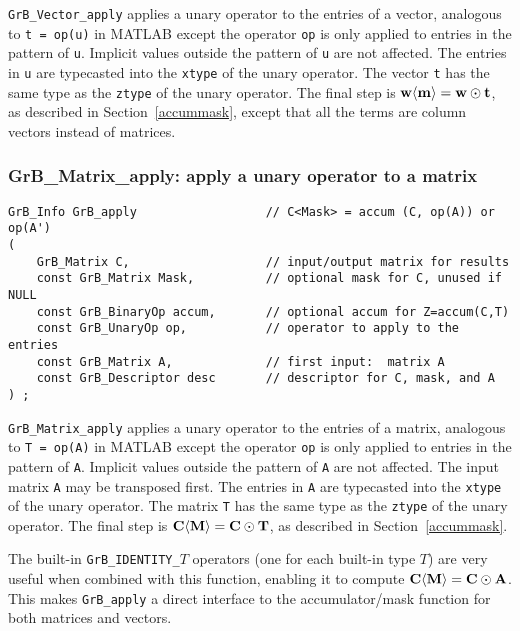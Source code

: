 \documentclass[12pt]{article}
\begin{document}
\verb'GrB_Vector_apply' applies a unary operator to the entries of a vector,
analogous to \verb't = op(u)'  in MATLAB except the operator \verb'op' is only
applied to entries in the pattern of \verb'u'.  Implicit values outside the
pattern of \verb'u' are not affected.  The entries in \verb'u' are typecasted
into the \verb'xtype' of the unary operator.  The vector \verb't' has the same
type as the \verb'ztype' of the unary operator.  The final step is ${\bf w
\langle m \rangle  = w \odot t}$, as described in Section~\ref{accummask},
except that all the terms are column vectors instead of matrices.

\newpage
\subsubsection{{\sf GrB\_Matrix\_apply:} apply a unary operator to a matrix}
\label{apply_matrix}

\begin{mdframed}[userdefinedwidth=6in]
{\footnotesize
\begin{verbatim}
GrB_Info GrB_apply                  // C<Mask> = accum (C, op(A)) or op(A')
(
    GrB_Matrix C,                   // input/output matrix for results
    const GrB_Matrix Mask,          // optional mask for C, unused if NULL
    const GrB_BinaryOp accum,       // optional accum for Z=accum(C,T)
    const GrB_UnaryOp op,           // operator to apply to the entries
    const GrB_Matrix A,             // first input:  matrix A
    const GrB_Descriptor desc       // descriptor for C, mask, and A
) ;
\end{verbatim} } \end{mdframed}

\verb'GrB_Matrix_apply'
applies a unary operator to the entries of a matrix, analogous to
\verb'T = op(A)'  in MATLAB except the operator \verb'op' is only applied to
entries in the pattern of \verb'A'.  Implicit values outside the pattern of
\verb'A' are not affected.  The input matrix \verb'A' may be transposed first.
The entries in \verb'A' are typecasted into the \verb'xtype' of the unary
operator.  The matrix \verb'T' has the same type as the \verb'ztype' of the
unary operator.  The final step is ${\bf C \langle M \rangle  = C \odot T}$, as
described in Section~\ref{accummask}.

The built-in \verb'GrB_IDENTITY_'$T$ operators (one for each built-in type $T$)
are very useful when combined with this function, enabling it to compute ${\bf
C \langle M \rangle  = C \odot A}$.  This makes \verb'GrB_apply' a direct
interface to the accumulator/mask function for both matrices and vectors.
\end{document}

